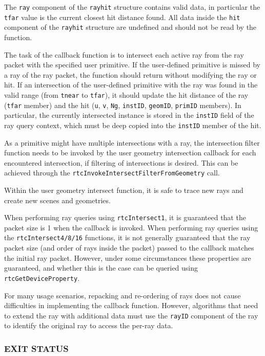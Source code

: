 The \texttt{ray} component of the \texttt{rayhit} structure contains
valid data, in particular the \texttt{tfar} value is the current closest
hit distance found. All data inside the \texttt{hit} component of the
\texttt{rayhit} structure are undefined and should not be read by the
function.

The task of the callback function is to intersect each active ray from
the ray packet with the specified user primitive. If the user-defined
primitive is missed by a ray of the ray packet, the function should
return without modifying the ray or hit. If an intersection of the
user-defined primitive with the ray was found in the valid range (from
\texttt{tnear} to \texttt{tfar}), it should update the hit distance of
the ray (\texttt{tfar} member) and the hit (\texttt{u}, \texttt{v},
\texttt{Ng}, \texttt{instID}, \texttt{geomID}, \texttt{primID} members).
In particular, the currently intersected instance is stored in the
\texttt{instID} field of the ray query context, which must be deep
copied into the \texttt{instID} member of the hit.

As a primitive might have multiple intersections with a ray, the
intersection filter function needs to be invoked by the user geometry
intersection callback for each encountered intersection, if filtering of
intersections is desired. This can be achieved through the
\texttt{rtcInvokeIntersectFilterFromGeometry} call.

Within the user geometry intersect function, it is safe to trace new
rays and create new scenes and geometries.

When performing ray queries using \texttt{rtcIntersect1}, it is
guaranteed that the packet size is 1 when the callback is invoked. When
performing ray queries using the \texttt{rtcIntersect4/8/16} functions,
it is not generally guaranteed that the ray packet size (and order of
rays inside the packet) passed to the callback matches the initial ray
packet. However, under some circumstances these properties are
guaranteed, and whether this is the case can be queried using
\texttt{rtcGetDeviceProperty}.

For many usage scenarios, repacking and re-ordering of rays does not
cause difficulties in implementing the callback function. However,
algorithms that need to extend the ray with additional data must use the
\texttt{rayID} component of the ray to identify the original ray to
access the per-ray data.

\subsubsection{EXIT STATUS}\label{exit-status}

